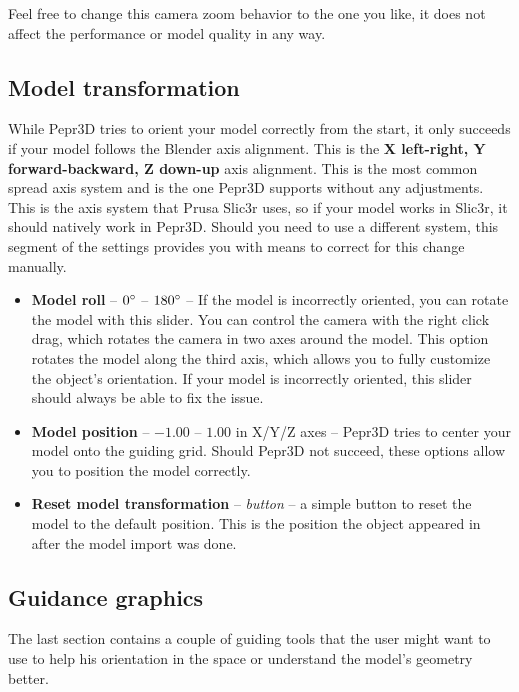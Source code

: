 Feel free to change this camera zoom behavior to the one you like, it does not affect the performance or model quality in any way.

\subsection{Model transformation}

While Pepr3D tries to orient your model correctly from the start, it only succeeds if your model follows the Blender axis alignment. This is the \textbf{X left-right, Y forward-backward, Z down-up} axis alignment. This is the most common spread axis system and is the one Pepr3D supports without any adjustments. This is the axis system that Prusa Slic3r uses, so if your model works in Slic3r, it should natively work in Pepr3D. Should you need to use a different system, this segment of the settings provides you with means to correct for this change manually.

\begin{itemize}

\item \textbf{Model roll} -- $0\degree$ -- $180\degree$ -- If the model is incorrectly oriented, you can rotate the model with this slider. You can control the camera with the right click drag, which rotates the camera in two axes around the model. This option rotates the model along the third axis, which allows you to fully customize the object's orientation. If your model is incorrectly oriented, this slider should always be able to fix the issue.

\item \textbf{Model position} -- $-1.00$ -- $1.00$ in X/Y/Z axes -- Pepr3D tries to center your model onto the guiding grid. Should Pepr3D not succeed, these options allow you to position the model correctly.

\item \textbf{Reset model transformation} -- \textit{button} -- a simple button to reset the model to the default position. This is the position the object appeared in after the model import was done.

\end{itemize}

\subsection{Guidance graphics}

The last section contains a couple of guiding tools that the user might want to use to help his orientation in the space or understand the model's geometry better.

